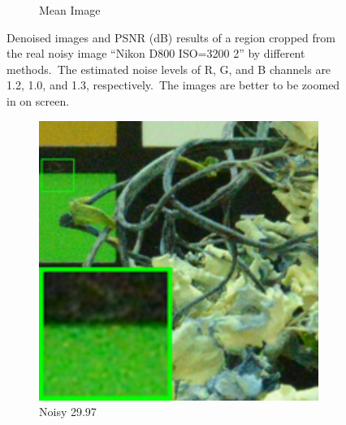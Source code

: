 \begin{figure}
\begin{subfigure}[t]{0.19\textwidth}
		\caption{Mean Image}
    \end{subfigure}
    \caption{Denoised images and PSNR (dB) results of a region cropped from the real noisy image ``Nikon D800 ISO=3200 2'' \cite{crosschannel2016} by different methods.\ The estimated noise levels of R, G, and B channels are 1.2, 1.0, and 1.3, respectively.\ The images are better to be zoomed in on screen.}
    \label{fig4-18}
\end{figure}



\begin{figure}
    \centering
    \begin{subfigure}[t]{0.19\textwidth}
        \centering
        \includegraphics[width=1\textwidth]{images/mcwnnm/cc/resize_br_Noisy_d800_iso6400_2.png}
		\caption{Noisy 29.97}
    \end{subfigure}
    \hfill
    \begin{subfigure}[t]{0.19\textwidth}
        \centering

\end{subfigure}
\end{figure}
